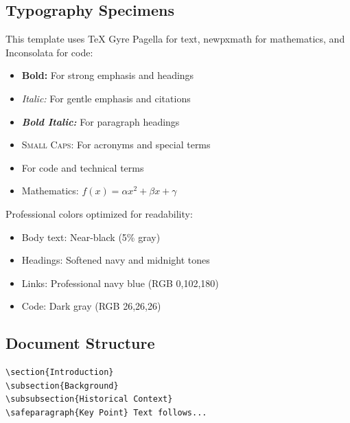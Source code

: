 \documentclass[11pt]{article}
\begin{document}
\subsection{Typography Specimens}

 This template uses TeX Gyre Pagella for text, newpxmath for mathematics, and Inconsolata for code:

\begin{itemize}
\item \textbf{Bold:} For strong emphasis and headings
\item \textit{Italic:} For gentle emphasis and citations
\item \textbf{\textit{Bold Italic:}} For paragraph headings
\item \textsc{Small Caps:} For acronyms and special terms
\item {} For code and technical terms
\item Mathematics: $f(x) = \alpha x^2 + \beta x + \gamma$
\end{itemize}

 Professional colors optimized for readability:
\begin{itemize}
\item Body text: Near-black (5\% gray)
\item Headings: Softened navy and midnight tones
\item Links: Professional navy blue (RGB 0,102,180)
\item Code: Dark gray (RGB 26,26,26)
\end{itemize}

\subsection{Document Structure}

\begin{verbatim}
\section{Introduction}
\subsection{Background}
\subsubsection{Historical Context}
\safeparagraph{Key Point} Text follows...
\end{verbatim}
\end{document}
